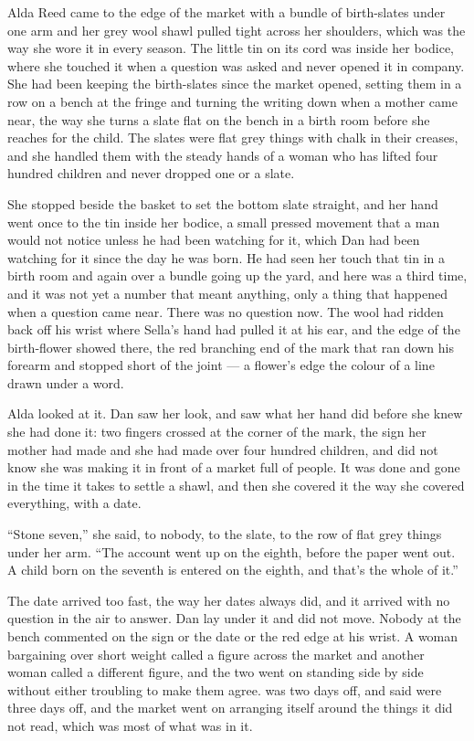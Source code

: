 \scenebreak

Alda Reed came to the edge of the market with a bundle of birth-slates under one arm and her grey wool shawl pulled tight across her shoulders, which was the way she wore it in every season. The little tin on its cord was inside her bodice, where she touched it when a question was asked and never opened it in company. She had been keeping the birth-slates since the market opened, setting them in a row on a bench at the fringe and turning the writing down when a mother came near, the way she turns a slate flat on the bench in a birth room before she reaches for the child. The slates were flat grey things with chalk in their creases, and she handled them with the steady hands of a woman who has lifted four hundred children and never dropped one or a slate.

She stopped beside the basket to set the bottom slate straight, and her hand went once to the tin inside her bodice, a small pressed movement that a man would not notice unless he had been watching for it, which Dan had been watching for it since the day he was born. He had seen her touch that tin in a birth room and again over a bundle going up the yard, and here was a third time, and it was not yet a number that meant anything, only a thing that happened when a question came near. There was no question now. The wool had ridden back off his wrist where Sella's hand had pulled it at his ear, and the edge of the birth-flower showed there, the red branching end of the mark that ran down his forearm and stopped short of the joint — a flower's edge the colour of a line drawn under a word.

Alda looked at it. Dan saw her look, and saw what her hand did before she knew she had done it: two fingers crossed at the corner of the mark, the sign her mother had made and she had made over four hundred children, and did not know she was making it in front of a market full of people. It was done and gone in the time it takes to settle a shawl, and then she covered it the way she covered everything, with a date.

“Stone seven,” she said, to nobody, to the slate, to the row of flat grey things under her arm. “The account went up on the eighth, before the paper went out. A child born on the seventh is entered on the eighth, and that's the whole of it.”

The date arrived too fast, the way her dates always did, and it arrived with no question in the air to answer. Dan lay under it and did not move. Nobody at the bench commented on the sign or the date or the red edge at his wrist. A woman bargaining over short weight called a figure across the market and another woman called a different figure, and the two went on standing side by side without either troubling to make them agree.  was two days off, and  said  were three days off, and the market went on arranging itself around the things it did not read, which was most of what was in it.

